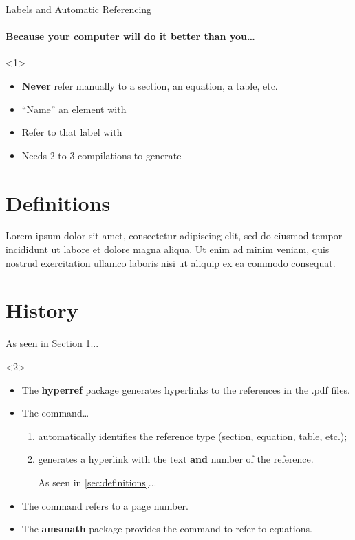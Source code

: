 \begin{frame}[fragile]{Labels and Automatic Referencing}
	\framesubtitle{Because your computer will do it better than you\ldots}
	\begin{onlyenv}
		\begin{itemize}
			\item \textbf{Never} refer manually to a section, an equation, a table, etc.
			\item ``Name'' an element with 
			\item Refer to that label with 
			\item Needs 2 to 3 compilations to generate
		\end{itemize}
	
\begin{codesource}
	\section{Definitions}
		\label{sec:definitions}
	
		Lorem ipsum dolor sit amet, consectetur adipiscing elit, 
		sed do eiusmod tempor incididunt ut labore et dolore magna aliqua. 
		Ut enim ad minim veniam, quis nostrud exercitation ullamco laboris 
		nisi ut aliquip ex ea commodo consequat.
	
	\section{History}
		As seen in Section \ref{sec:definitions}...
\end{codesource}
	\end{onlyenv}
	\begin{onlyenv}
		\begin{itemize}
			\item The \textbf{hyperref} package generates hyperlinks to the references in the .pdf files.
			\item The  command\ldots
				\begin{enumerate}
					\item automatically identifies the reference type (section, equation, table, etc.);
					\item generates a hyperlink with the text \textbf{and} number of the reference.
\begin{codesource}
	As seen in \autoref{sec:definitions}...
\end{codesource}
				\end{enumerate}
			\item The  command refers to a page number.
			\item The  \textbf{amsmath} package provides the  command to refer to equations.
		\end{itemize}
	\end{onlyenv}
\end{frame}